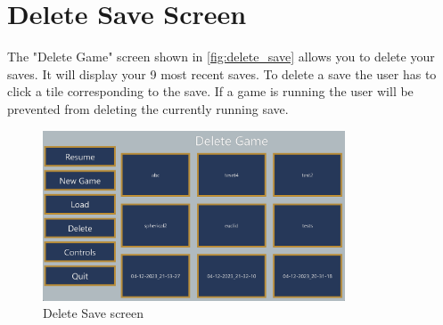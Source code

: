 \section{Delete Save Screen} \label{delete_save_screen}
The "Delete Game" screen shown in \autoref{fig:delete_save} allows you to delete your saves.
It will display your 9 most recent saves.
To delete a save the user has to click a tile corresponding to the save.
If a game is running the user will be prevented from deleting the currently running save.

\begin{figure}[h]
    \centering
    \includegraphics[width=0.8\textwidth]{chapters/user_manual/resources/delete-game.png}
    \caption{Delete Save screen}
    \label{fig:delete_save}
\end{figure}